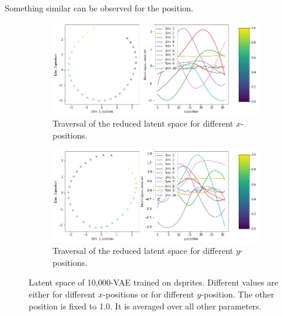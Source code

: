 Something similar can be observed for the position.
\begin{figure}
    \centering
    \begin{subfigure}{.48\textwidth}
        \includegraphics[width=\textwidth]{images/latent_space_traversals/vae_10000_dsprites_latent_space_values_x_position.png}
        \caption{Traversal of the reduced latent space for different $x$-positions.}
        \label{subfig:vae_dsprites_x_pos_latent_space_route}
    \end{subfigure}
    \begin{subfigure}{.48\textwidth}
        \includegraphics[width=\textwidth]{images/latent_space_traversals/vae_10000_dsprites_latent_space_values_y_position.png}
        \caption{Traversal of the reduced latent space for different $y$-positions.}
        \label{subfig:vae_dsprites_y_pos_latent_space_route}
    \end{subfigure}
    \caption[VAE on dsprites: Latent Space Values]{Latent space of 10,000-VAE trained on dsprites. Different values are either for different $x$-positions or for different $y$-position. The other position is fixed to 1.0. It is averaged over all other parameters.}
    \label{fig:vae_dsprites_latent_space_x_position}
\end{figure}


